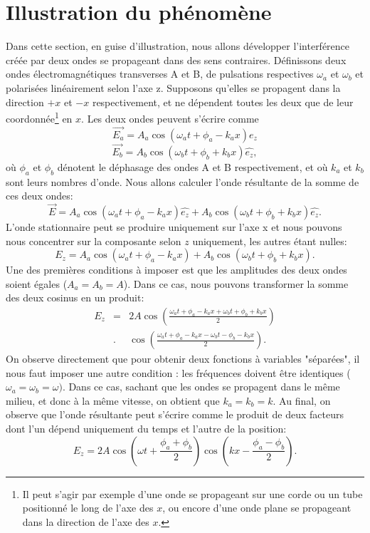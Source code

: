 \section{Illustration du phénomène}
Dans cette section, en guise d'illustration, nous allons développer l'interférence créée par deux ondes se propageant dans des sens contraires. Définissons deux ondes électromagnétiques transverses A et B, de pulsations respectives $\omega_a$ et $\omega_b$ et polarisées linéairement selon l'axe z. Supposons qu'elles se propagent dans la direction $+x$ et $-x$ respectivement, et ne dépendent toutes les deux que de leur coordonnée\footnote{Il peut s'agir par exemple d'une onde se propageant sur une corde ou un tube positionné le long de l'axe des $x$, ou encore d'une onde plane se propageant dans la direction de l'axe des $x$.} en $x$. Les deux ondes peuvent s'écrire comme 
$$ \vec{E_a}=A_a\cos(\omega_a t+ \phi_a-k_ax) \hat{e_z}$$
$$ \vec{E_b}=A_b\cos(\omega_b t+\phi_b+k_bx) \hat{e_z},$$
où $\phi_a$ et $\phi_b$ dénotent le déphasage des ondes A et B respectivement, et où $k_a$ et $k_b$ sont leurs nombres d'onde.
Nous allons calculer l'onde résultante de la somme de ces deux ondes: 
$$ \vec{E}=A_a\cos(\omega_a t+\phi_a-k_ax) \hat{e_z} + A_b\cos(\omega_b t+\phi_b+k_bx) \hat{e_z}.$$
L'onde stationnaire peut se produire uniquement sur l'axe x et nous pouvons nous concentrer sur la composante selon $z$ uniquement, les autres étant nulles:
$$ E_z=A_a\cos(\omega_a t+\phi_a-k_ax) + A_b\cos(\omega_b t+\phi_b+k_bx).$$
Une des premières conditions à imposer est que les amplitudes des deux ondes soient égales ($A_a=A_b=A$). Dans ce cas, nous pouvons transformer la somme des deux cosinus en un produit: 
\begin{eqnarray}
E_z&=&2A\cos\left(\frac{\omega_a t+\phi_a-k_ax+\omega_b t+\phi_b+k_bx}{2}\right)\nonumber \\&.&\cos\left(\frac{\omega_a t+\phi_a-k_ax-\omega_b t-\phi_b-k_bx}{2}\right).
\end{eqnarray}
On observe directement que pour obtenir deux fonctions à variables "séparées", il nous faut imposer une autre condition : les fréquences doivent être identiques ($\omega_a=\omega_b=\omega)$. Dans ce cas, sachant que les ondes se propagent dans le même milieu, et donc à la même vitesse, on obtient que $k_a=k_b=k$. Au final, on observe que l'onde résultante peut s'écrire comme le produit de deux facteurs dont l'un dépend uniquement du temps et l'autre de la position:
$$ E_z=2A\cos(\omega t+\frac{\phi_a+\phi_b}{2})\cos(kx-\frac{\phi_a-\phi_b}{2}).$$

